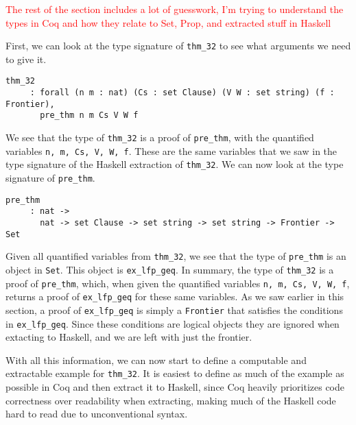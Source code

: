 \textcolor{red}{The rest of the section includes a lot of guesswork, I'm trying to understand the types in Coq and how they relate to Set, Prop, and extracted stuff in Haskell}

First, we can look at the type signature of \lstinline{thm_32} to see what arguments we need to give it.

\begin{minipage}{\linewidth}
\begin{lstlisting}[language=Coq, label={lst:thm_32_type_sig_coq}, caption={Type signature of \lstinline{thm_32} in Coq}]
thm_32
     : forall (n m : nat) (Cs : set Clause) (V W : set string) (f : Frontier),
       pre_thm n m Cs V W f
\end{lstlisting}
\end{minipage}

We see that the type of \lstinline{thm_32} is a proof of \lstinline{pre_thm}, with the quantified variables
\lstinline{n, m, Cs, V, W, f}.
These are the same variables that we saw in the type signature of the Haskell extraction of \lstinline{thm_32}.
We can now look at the type signature of \lstinline{pre_thm}.

\begin{minipage}{\linewidth}
\begin{lstlisting}[language=Coq, label={lst:pre_thm_type_sig_coq}, caption={Type signature of \lstinline{pre_thm} in Coq}]
pre_thm
     : nat ->
       nat -> set Clause -> set string -> set string -> Frontier -> Set
\end{lstlisting}
\end{minipage}

Given all quantified variables from \lstinline{thm_32}, we see that the type of \lstinline{pre_thm} is
an object in \lstinline{Set}. This object is \lstinline{ex_lfp_geq}.
\textcolor{something about depedenent types? since the type of ex_lfp_geq depends on the values of the quantified variables?}

In summary, the type of \lstinline{thm_32} is a proof of \lstinline{pre_thm}, which,
when given the quantified variables \lstinline{n, m, Cs, V, W, f}, returns a proof of \lstinline{ex_lfp_geq}
for these same variables.
As we saw earlier in this section, a proof of \lstinline{ex_lfp_geq}
is simply a \lstinline{Frontier} that satisfies the conditions in \lstinline{ex_lfp_geq}.
Since these conditions are logical objects they are ignored when extacting to Haskell,
and we are left with just the frontier.

With all this information, we can now start to define a computable and extractable example for \lstinline{thm_32}.
It is easiest to define as much of the example as possible in Coq and then extract it to Haskell,
since Coq heavily prioritizes code correctness over readability when extracting,
making much of the Haskell code hard to read due to unconventional syntax.

